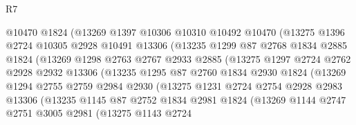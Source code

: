 \begin{lexlean}{R7}
\begin{coremodule}
                    @10470
                    @1824
                    (@13269
                      @1397
                      @10306
                      @10310
                      @10492
                      @10470
                      (@13275
                        @1396
                        @2724
                        @10305
                        @2928
                        @10491
                        @13306
                        (@13235
                          @1299
                          @87
                          @2768
                          @1834
                          @2885
                          @1824
                          (@13269
                            @1298
                            @2763
                            @2767
                            @2933
                            @2885
                            (@13275
                              @1297
                              @2724
                              @2762
                              @2928
                              @2932
                              @13306
                              (@13235
                                @1295
                                @87
                                @2760
                                @1834
                                @2930
                                @1824
                                (@13269
                                  @1294
                                  @2755
                                  @2759
                                  @2984
                                  @2930
                                  (@13275
                                    @1231
                                    @2724
                                    @2754
                                    @2928
                                    @2983
                                    @13306
                                    (@13235
                                      @1145
                                      @87
                                      @2752
                                      @1834
                                      @2981
                                      @1824
                                      (@13269
                                        @1144
                                        @2747
                                        @2751
                                        @3005
                                        @2981
                                        (@13275
                                          @1143
                                          @2724

\end{coremodule}
\end{lexlean}
